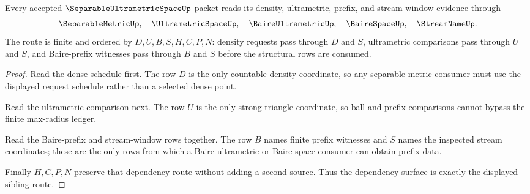 \begin{theorem}
\label{thm:separable-ultrametric-space-dependency-obligations}
Every accepted $\SeparableUltrametricSpaceUp$ packet reads its density, ultrametric, prefix, and stream-window evidence through
$$
\SeparableMetricUp,\quad \UltrametricSpaceUp,\quad \BaireUltrametricUp,\quad \BaireSpaceUp,\quad \StreamNameUp .
$$
The route is finite and ordered by $D,U,B,S,H,C,P,N$: density requests pass through $D$ and $S$, ultrametric comparisons pass through $U$ and $S$, and Baire-prefix witnesses pass through $B$ and $S$ before the structural rows are consumed.
\end{theorem}
\begin{proof}
Read the dense schedule first. The row $D$ is the only countable-density coordinate, so any separable-metric consumer must use the displayed request schedule rather than a selected dense point.

Read the ultrametric comparison next. The row $U$ is the only strong-triangle coordinate, so ball and prefix comparisons cannot bypass the finite max-radius ledger.

Read the Baire-prefix and stream-window rows together. The row $B$ names finite prefix witnesses and $S$ names the inspected stream coordinates; these are the only rows from which a Baire ultrametric or Baire-space consumer can obtain prefix data.

Finally $H,C,P,N$ preserve that dependency route without adding a second source. Thus the dependency surface is exactly the displayed sibling route.
\end{proof}

